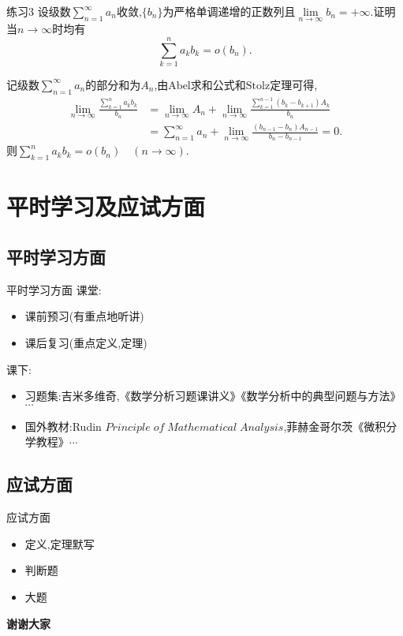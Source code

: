 \documentclass[UTF8]{ctexbeamer}
\begin{document}
    \begin{frame}
        \begin{exampleblock}{练习3}
            设级数$\sum\limits_{n=1}^{\infty}a_n$收敛,$\{b_n\}$为严格单调递增的正数列且$\lim\limits_{n\to\infty}b_n=+\infty$.证明当$n\to\infty$时均有
            $$\sum_{k=1}^{n}a_kb_k=o(b_n).$$
        \end{exampleblock}
        \pause
        记级数$\sum\limits_{n=1}^{\infty}a_n$的部分和为$A_n$,由$\mathrm{Abel}$求和公式和$\mathrm{Stolz}$定理可得,
        $$
        \begin{aligned}
            \lim_{n\to\infty}\frac{\sum\limits_{k=1}^{n}a_kb_k}{b_n}&=\lim_{n\to\infty}A_n+\lim_{n\to\infty}\frac{\sum\limits_{k=1}^{n-1}(b_k-b_{k+1})A_k}{b_n}\\
            &=\sum\limits_{n=1}^{\infty}a_n+\lim\limits_{n\to\infty}\frac{(b_{n-1}-b_n)A_{n-1}}{b_n-b_{n-1}}=0.
        \end{aligned}
        $$
        \pause
        则$\sum\limits_{k=1}^{n}a_kb_k=o(b_n)\quad (n\to\infty).$
    \end{frame}
    \section{平时学习及应试方面}
    \subsection{平时学习方面}
    \begin{frame}{平时学习方面}
        \pause
        课堂:
        \begin{itemize}
            \item 课前预习(有重点地听讲)
            \item 课后复习(重点定义,定理)
        \end{itemize}
        \pause
        课下:
        \begin{itemize}
            \item 习题集:吉米多维奇,《数学分析习题课讲义》《数学分析中的典型问题与方法》$\cdots$
            \item 国外教材:Rudin $Principle\;of\;Mathematical\;Analysis$,菲赫金哥尔茨《微积分学教程》$\cdots$
        \end{itemize}
    \end{frame}
    \subsection{应试方面}
    \begin{frame}{应试方面}
        \begin{itemize}
            \item 定义,定理默写
            \item 判断题
            \item 大题
        \end{itemize}
    \end{frame}
    \begin{frame}
        \begin{center}
            \textbf{\Huge{谢谢大家}}
        \end{center}
    \end{frame}
\end{document}
